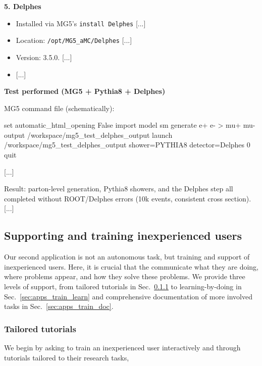 \documentclass[submission, Phys]{SciPost}
\begin{document}
\begin{finalblock}[\ma (shortened)]
\textbf{5. Delphes}

\begin{itemize}
\item Installed via MG5’s \lstinline|install Delphes| [...]
\item Location: \lstinline|/opt/MG5_aMC/Delphes| [...]
\item Version: 3.5.0. [...]
\item {[...]}
\end{itemize}

\textbf{Test performed (MG5 + Pythia8 + Delphes)}

MG5 command file (schematically):

\begin{bashblock}
set automatic_html_opening False
import model sm
generate e+ e- > mu+ mu-
output /workspace/mg5_test_delphes_output
launch /workspace/mg5_test_delphes_output
shower=PYTHIA8
detector=Delphes
0
quit
\end{bashblock}
[...]

Result: parton-level generation, Pythia8 showers, and the Delphes step all completed without ROOT/Delphes errors (10k events, consistent cross section). [...]
\end{finalblock}

\clearpage
\subsection{Supporting and training inexperienced users}
\label{sec:apps_train}

Our second \ma application is not an autonomous task, but training and support of inexperienced users. Here, it is crucial that the \ma communicate what they are doing, where problems appear, and how they solve these problems. We provide three levels of support, from tailored tutorials in Sec.~\ref{sec:apps_train_tut} to learning-by-doing in Sec.~\ref{sec:apps_train_learn} and comprehensive documentation of more involved tasks in Sec.~\ref{sec:apps_train_doc}.

\subsubsection{Tailored tutorials}
\label{sec:apps_train_tut}

We begin by asking \ma to train an inexperienced user interactively and through tutorials tailored to their research tasks,
\end{document}
